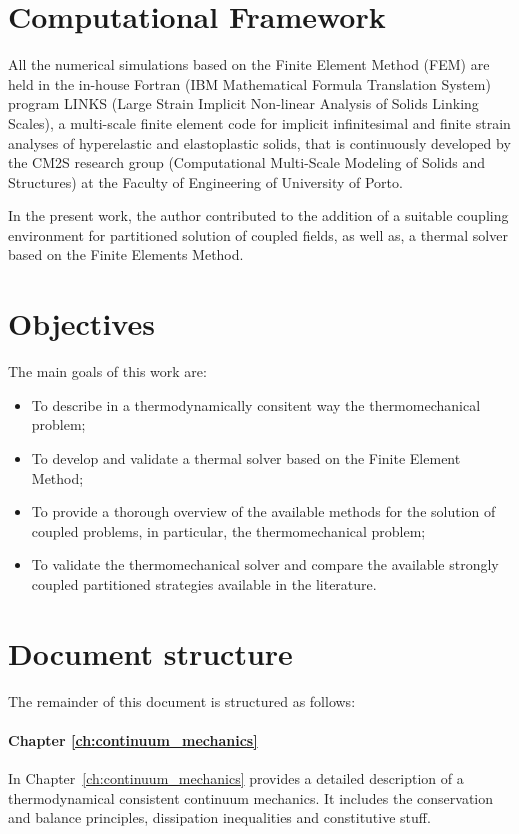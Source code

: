 \section{Computational Framework}

All the numerical simulations based on the Finite Element Method (FEM) are held in the in-house Fortran (IBM Mathematical Formula Translation System) program LINKS (Large Strain Implicit Non-linear Analysis of Solids Linking Scales), a multi-scale finite element code for implicit infinitesimal and finite strain analyses of hyperelastic and elastoplastic solids, that is continuously developed by the CM2S research group (Computational Multi-Scale Modeling of Solids and Structures) at the Faculty of Engineering of University of Porto.

In the present work, the author contributed to the addition of a suitable coupling environment for partitioned solution of coupled fields, as well as, a thermal solver based on the Finite Elements Method.

\section{Objectives}

The main goals of this work are:
\begin{itemize}
    \item To describe in a thermodynamically consitent way the thermomechanical problem;
    \item To develop and validate a thermal solver based on the Finite Element Method;
    \item To provide a thorough overview of the available methods for the solution of coupled problems, in particular, the thermomechanical problem;
    \item To validate the thermomechanical solver and compare the available strongly coupled partitioned strategies available in the literature.
\end{itemize}

\section{Document structure}

The remainder of this document is structured as follows:

\paragraph{Chapter \ref{ch:continuum_mechanics}}
In Chapter~\ref{ch:continuum_mechanics} provides a detailed description of a thermodynamical consistent continuum mechanics.
It includes the conservation and balance principles, dissipation inequalities and constitutive stuff.

